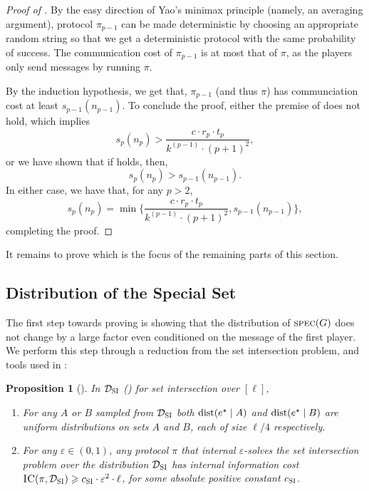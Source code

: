 \documentclass[11pt]{article}
\newtheorem{proposition}[lemma]{Proposition}
\theoremstyle{definition}
\renewcommand{\geq}{\geqslant}
\newcommand{\eps}{\ensuremath{\varepsilon}}
\newcommand{\distribution}[1]{\ensuremath{\textnormal{dist}(#1)}\xspace}
\newcommand{\spec}{\ensuremath{\textnormal{\textsc{spec}}}}
\newcommand{\prot}{\ensuremath{\pi}}
\newcommand{\estar}{\ensuremath{e^{\star}}}
\newcommand{\ic}{\ensuremath{\textnormal{\textsc{IC}}}}
\newcommand{\cDSI}{\ensuremath{\mathcal{D}_{\textnormal{\textsc{SI}}}}}
\begin{document}
\begin{proof}[Proof of ]
	By the easy direction of Yao's minimax principle (namely, an averaging argument), protocol $\prot_{p-1}$ can be made deterministic by choosing an appropriate random string so that we get a deterministic protocol with the same probability of success. The communication cost of $\prot_{p-1}$ is at most that of $\prot$, as the players only send messages by running $\prot$. 
	
	By the induction hypothesis, we get that, $\prot_{p-1}$ (and thus $\prot$) has communciation cost at least $s_{p-1}(n_{p-1})$. 
	To conclude the proof, either the premise of  does not hold, which implies
	\[
		s_p(n_p) >  \frac{c \cdot r_p \cdot t_p}{k^{(p-1)} \cdot (p+1)^2},
	\]
	or we have shown that if  holds, then,
	\[
		s_p(n_{p}) > s_{p-1}(n_{p-1}). 
	\]
	In either case, we have that, for any $p > 2$, 
	\[
	 s_p(n_p) = \min\Big\{\frac{c \cdot r_p \cdot t_p}{k^{(p-1)} \cdot (p+1)^2}, s_{p-1}(n_{p-1})\Big\} ,
	\]
	completing the proof.
	\end{proof}

	It remains to prove  which is the focus of the remaining parts of this section.	

	\subsection{Distribution of the Special Set}\label{subsec:adv-specset}
	
	The first step towards proving  is showing that the distribution of $\spec(G)$ does not change by a large factor even conditioned on the message of the first player. 	
	We perform this step through a reduction from the set intersection problem, and tools used in \cite{AssadiR20}: 
	
	\begin{proposition}[\!]\label{prop:set-int}
		In $\cDSI$ () for set intersection over $[\ell]$, 
		\begin{enumerate}[label=$(\roman*)$]
			\item For any $A$ or $B$ sampled from $\cDSI$ both $\distribution{\estar \mid A}$ and $\distribution{\estar \mid B}$ are uniform distributions on sets $A$ and $B$, each of size $\ell/4$ respectively. 
			\item For any $\eps \in (0,1)$, any protocol $\prot$ that internal $\eps$-solves the set intersection problem over the distribution $\cDSI$ has internal information cost $\ic(\prot, \cDSI) \geq \cSI\cdot \eps^2 \cdot \ell$, for some absolute positive constant $c_{\textnormal{\textsc{SI}}}$. 
		\end{enumerate}
	\end{proposition}
	
\end{document}
